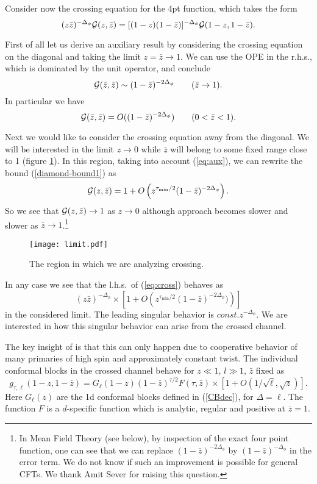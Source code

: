 \documentclass[12pt]{article}
\newcommand{\reef}[1]{(\ref{#1})}
\newcommand{\beq}{\begin{equation}}
\newcommand{\eeq}{\end{equation}}
\def\calG {{\cal G}}
\newcommand{\Df}{{\Delta_\phi}}
\numberwithin{equation}{section}
\begin{document}
Consider now the crossing equation for the 4pt function, which takes the form
\beq
\label{eq:cross}
(z\bar z)^{-{\Df}} \calG(z,\bar z)=[(1-z)(1-\bar z)]^{-\Df} \calG(1-z,1-\bar z).
\eeq

First of all let us derive an auxiliary result by considering the crossing equation on the diagonal and taking the limit $z=\bar z\to 1$. We can use the OPE in the r.h.s., which is dominated by the unit operator, and conclude
\beq
\calG(\bar z, \bar z) \sim (1-\bar z)^{-2\Df}\qquad (\bar z\to 1).
\eeq
In particular we have 
\beq
\label{eq:aux}
\calG(\bar z, \bar z) =O( (1-\bar z)^{-2\Df})\qquad (0<\bar z<1).
\eeq

Next we would like to consider the crossing equation away from the diagonal. We will be interested in the limit $z\to0$ while $\bar z$ will belong to some fixed range close to 1 (figure \ref{limit}). In this region, taking into account \reef{eq:aux}, we can rewrite the bound \reef{diamond-bound1} as
\beq
\label{eq:errorterm}
\calG(z,\bar z) = 1+O\left(z^{\tau_{\min}/2}(1-\bar z)^{-2\Df}\right).
\eeq
So we see that $\calG(z,\bar z)\to 1$ as $z\to 0$ although approach becomes slower and slower as $\bar z\to 1$.\footnote{In Mean Field Theory (see below), by inspection of the exact four point function, one can see that we can replace $(1-\bar z)^{-2\Df}$ by $(1-\bar z)^{-\Df}$ in the error term. We do not know if such an improvement is possible for general CFTs. We thank Amit Sever for raising this question.}

\begin{figure}
\centering
\texttt{[image: limit.pdf]}
\caption{The region in which we are analyzing crossing.}
\label{limit}
\end{figure}

In any case we see that the l.h.s.~of \reef{eq:cross} behaves as 
\beq
\label{eq:as-reg}
(z\bar z)^{-{\Df}}\times [1+O\left(z^{\tau_{\min}/2}(1-\bar z)^{-2\Df})\right)]
\eeq
in the considered limit. The leading singular behavior is $const.z^{-{\Df}}$. We are interested in how this singular behavior can arise from the crossed channel. 

The key insight of \cite{Fitzpatrick:2012yx,Komargodski:2012ek} is that this can only happen due to cooperative behavior of many primaries of high spin and approximately constant twist. The individual conformal blocks in the crossed channel behave for $z\ll 1$, $l\gg 1$, $\bar z$ fixed as \cite{Fitzpatrick:2012yx}
\beq
\label{eq:CBas-d}
g_{\tau,\ell}(1-z,1-\bar z) = G_{\ell}(1-z) (1-\bar z)^{\tau/2} F(\tau,\bar z)\times[1+O(1/\sqrt{\ell},\sqrt{z})].
\eeq
Here $G_{\ell}(z)$ are the 1d conformal blocks defined in \reef{CBdec}, for $\Delta=\ell$. The function $F$ is a $d$-specific function which is analytic, regular and positive at $\bar z=1$. 
\end{document}
